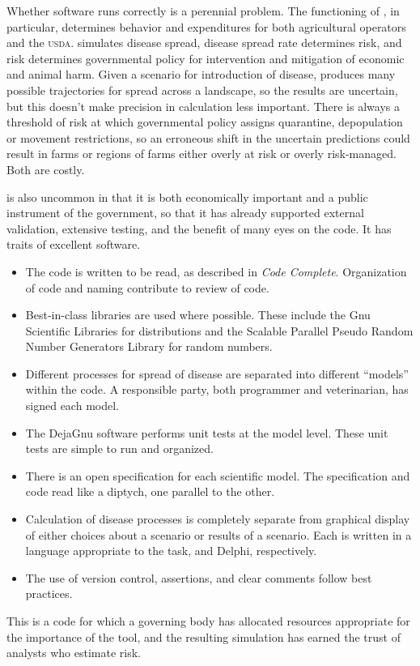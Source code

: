 \documentclass{article}
\begin{document}
Whether software runs correctly is a perennial problem\cite{hoare1996}.
The functioning of \naadsm, in particular, determines behavior
and expenditures for both agricultural operators and the \textsc{usda}.
\naadsm simulates disease spread, disease spread rate determines
risk, and risk determines governmental policy for intervention
and mitigation of economic and animal harm.
Given a scenario for introduction of disease, \naadsm produces
many possible trajectories for spread across a landscape, so the
results are uncertain, but this doesn't make precision in calculation
less important. There is always a threshold of risk at which
governmental policy assigns quarantine, depopulation or movement
restrictions, so an erroneous shift in the uncertain predictions
could result in farms or regions of farms either overly at risk
or overly risk-managed. Both are costly.

\naadsm is also uncommon in that it is both economically important
and a public instrument of the government, so that it has already
supported external validation, extensive testing, and the
benefit of many eyes on the code. It has traits of excellent
software.
\begin{itemize}
  \item The code is written to be read, as described
      in \emph{Code Complete}\cite{mcconnell2004code}. Organization
      of code and naming contribute to review of code.
  \item Best-in-class libraries are used where possible. These
    include the Gnu Scientific Libraries for distributions
    and the Scalable Parallel Pseudo Random Number Generators
    Library for random numbers.
  \item Different processes for spread of disease are separated
    into different ``models'' within the code. A responsible party,
    both programmer and veterinarian, has signed each model.
  \item The DejaGnu software performs unit tests at the model
    level. These unit tests are simple to run and organized.
  \item There is an open specification for each scientific
    model. The specification and code read like a diptych,
    one parallel to the other.
  \item Calculation of disease processes is completely separate
    from graphical display of either choices about a scenario
    or results of a scenario. Each is written in a language
    appropriate to the task, \CC and Delphi, respectively.
  \item The use of version control, assertions, and clear
    comments follow best practices\cite{hunt2000pragmatic}.
\end{itemize}
This is a code for which a governing body has allocated resources
appropriate for the importance of the tool, and the resulting
simulation has earned the trust of analysts who estimate risk.
\end{document}
